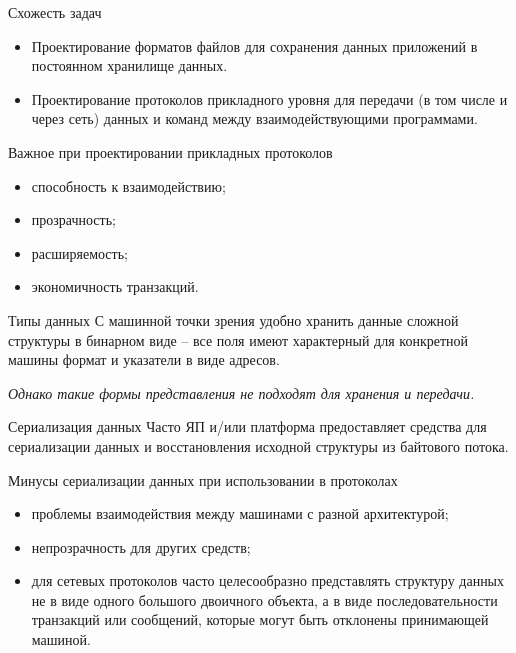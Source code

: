 \begin{frame}{Схожесть задач}
	\begin{itemize}
		\item Проектирование форматов файлов для сохранения данных приложений в постоянном хранилище данных.
		\item Проектирование протоколов прикладного уровня для передачи (в том числе и через сеть) данных и команд между взаимодействующими программами.
	\end{itemize}
\end{frame}

\begin{frame}{Важное при проектировании прикладных протоколов}
	\begin{itemize}
		\item способность к взаимодействию; 
			\pause
		\item прозрачность;
			\pause
		\item расширяемость;
			\pause
		\item экономичность транзакций.
	\end{itemize}
\end{frame}

\begin{frame}{Типы данных}
	С машинной точки зрения удобно хранить данные сложной структуры в бинарном виде -- все поля имеют характерный для конкретной машины формат и указатели в виде адресов.

	\pause
	{\itshape Однако такие формы представления не подходят для хранения и передачи.}
\end{frame}

\begin{frame}{Сериализация данных}
	Часто ЯП и/или платформа предоставляет средства для сериализации данных и восстановления исходной структуры из байтового потока.
\end{frame}

\begin{frame}{Минусы сериализации данных при использовании в протоколах}
	\begin{itemize}
		\item проблемы взаимодействия между машинами с разной архитектурой;
			\pause
		\item непрозрачность для других средств;
			\pause
		\item для сетевых протоколов часто целесообразно представлять структуру данных не в виде одного большого двоичного объекта,  а в виде последовательности транзакций или сообщений,  которые могут быть отклонены принимающей машиной.
	\end{itemize}
\end{frame}


